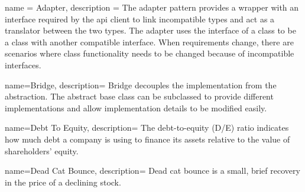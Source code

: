 

{
	name = {Adapter},
	description = {
		The adapter pattern provides a wrapper with an interface
		required by the \gls{api} client to link incompatible types and act as a
		translator between the two types. The adapter uses the interface
		of a class to be a class with another compatible interface. When
		requirements change, there are scenarios where class
		functionality needs to be changed because of incompatible
		interfaces.
	}
}

{
	name={Bridge},
	description={
			Bridge decouples the implementation from the abstraction. The
		abstract base class can be subclassed to provide different
		implementations and allow implementation details to be
		modified easily. 
	}
}



{
	name={Debt To Equity},
	description={
		The debt-to-equity (D/E) ratio indicates how much debt a company is using to finance its assets relative to the value of shareholders’ equity.
	}
}

{
	name={Dead Cat Bounce},
	description={
		Dead cat bounce is a small, brief recovery in the price of a declining stock.
	}
}
